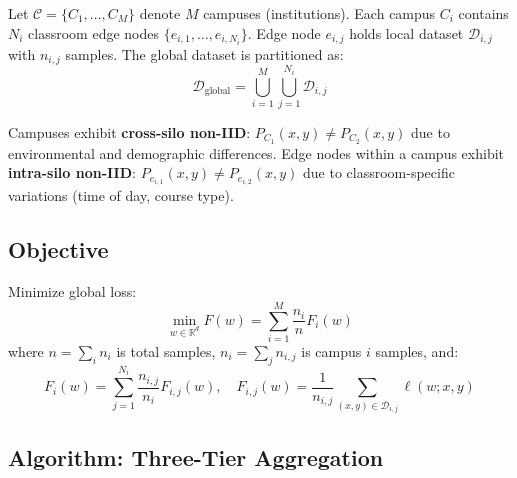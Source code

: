 \documentclass[conference]{IEEEtran}
\begin{document}
Let $\mathcal{C} = \{C_1, \ldots, C_M\}$ denote $M$ campuses (institutions). Each campus $C_i$ contains $N_i$ classroom edge nodes $\{e_{i,1}, \ldots, e_{i,N_i}\}$. Edge node $e_{i,j}$ holds local dataset $\mathcal{D}_{i,j}$ with $n_{i,j}$ samples. The global dataset is partitioned as:
\[
\mathcal{D}_{\text{global}} = \bigcup_{i=1}^{M} \bigcup_{j=1}^{N_i} \mathcal{D}_{i,j}
\]

Campuses exhibit \textbf{cross-silo non-IID}: $P_{C_1}(x,y) \neq P_{C_2}(x,y)$ due to environmental and demographic differences. Edge nodes within a campus exhibit \textbf{intra-silo non-IID}: $ P_{e_{i,1}}(x,y) \neq P_{e_{i,2}}(x,y)$ due to classroom-specific variations (time of day, course type).

\subsection{Objective}

Minimize global loss:
\begin{equation}
\min_{w \in \mathbb{R}^d} F(w) = \sum_{i=1}^{M} \frac{n_i}{n} F_i(w)
\end{equation}
where $n = \sum_i n_i$ is total samples, $n_i = \sum_j n_{i,j}$ is campus $i$ samples, and:
\begin{equation}
F_i(w) = \sum_{j=1}^{N_i} \frac{n_{i,j}}{n_i} F_{i,j}(w), \quad F_{i,j}(w) = \frac{1}{n_{i,j}} \sum_{(x,y) \in \mathcal{D}_{i,j}} \ell(w; x, y)
\end{equation}

\subsection{Algorithm: Three-Tier Aggregation}
\end{document}
